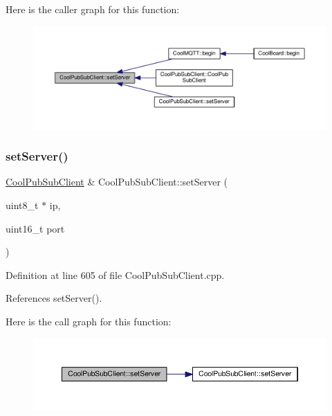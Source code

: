 Here is the caller graph for this function\+:\nopagebreak
\begin{figure}[H]
\begin{center}
\leavevmode
\includegraphics[width=350pt]{d8/d4b/class_cool_pub_sub_client_a947e70c394c66c7d08d0c53caf8425e3_icgraph}
\end{center}
\end{figure}
\mbox{\label{class_cool_pub_sub_client_ad589f977fc2799b9341dc5f4fcdb483a}} 
\subsubsection{\texorpdfstring{set\+Server()}{setServer()}\hspace{0.1cm}{\footnotesize\ttfamily [2/3]}}
{\footnotesize\ttfamily \hyperlink{class_cool_pub_sub_client}{Cool\+Pub\+Sub\+Client} \& Cool\+Pub\+Sub\+Client\+::set\+Server (\begin{DoxyParamCaption}\item[{uint8\+\_\+t $\ast$}]{ip,  }\item[{uint16\+\_\+t}]{port }\end{DoxyParamCaption})}



Definition at line 605 of file Cool\+Pub\+Sub\+Client.\+cpp.



References set\+Server().

Here is the call graph for this function\+:\nopagebreak
\begin{figure}[H]
\begin{center}
\leavevmode
\includegraphics[width=350pt]{d8/d4b/class_cool_pub_sub_client_ad589f977fc2799b9341dc5f4fcdb483a_cgraph}
\end{center}
\end{figure}
\mbox{\label{class_cool_pub_sub_client_a333ea9369dc88bb14d3fa6216e731c09}} 
